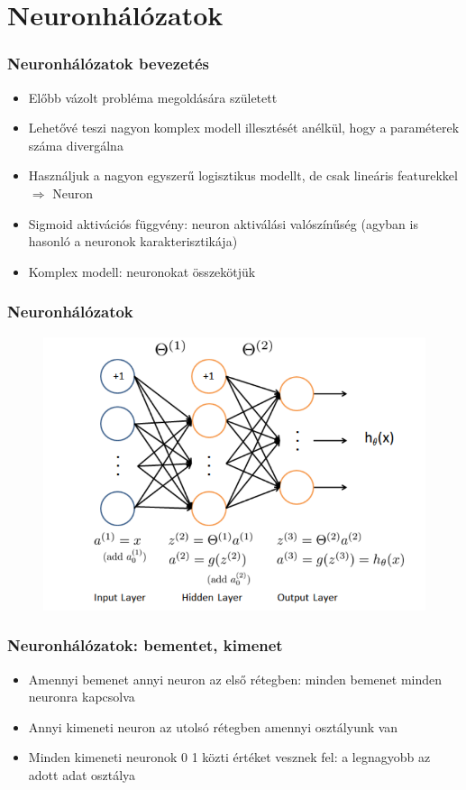 \documentclass{beamer}
\begin{document}
\section{Neuronhálózatok}
\begin{frame}
\frametitle{Neuronhálózatok bevezetés}
\begin{itemize}
  \setlength{\itemsep}{12pt}
\item Előbb vázolt probléma megoldására született
\item Lehetővé teszi nagyon komplex modell illesztését anélkül, hogy a paraméterek száma divergálna
\item Használjuk a nagyon egyszerű logisztikus modellt, de csak lineáris featurekkel $\Rightarrow$ Neuron
\item Sigmoid aktivációs függvény: neuron aktiválási valószínűség (agyban is hasonló a neuronok karakterisztikája)
\item Komplex modell: neuronokat összekötjük
\end{itemize}
\end{frame}

\begin{frame}
\frametitle{Neuronhálózatok}
\begin{figure}[H]
	\centering
    		\includegraphics[width=\textwidth]{pic/nn}
\end{figure}
\end{frame}

\begin{frame}
\frametitle{Neuronhálózatok: bementet, kimenet}
\begin{itemize}
  \setlength{\itemsep}{18pt}
  \item Amennyi bemenet annyi neuron az első rétegben: minden bemenet minden neuronra kapcsolva
  \item Annyi kimeneti neuron az utolsó rétegben amennyi osztályunk van
  \item Minden kimeneti neuronok 0 1 közti értéket vesznek fel: a legnagyobb az adott adat osztálya
  
\end{itemize}
\end{frame}
\end{document}
